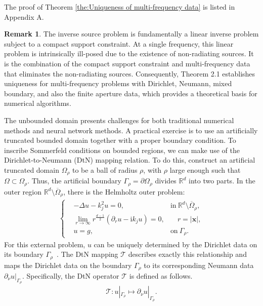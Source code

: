 \documentclass{article}
\theoremstyle{plain}
\theoremstyle{definition}
\newtheorem{remark}{\textbf{Remark}}
\begin{document}
The proof of Theorem \ref{the:Uniqueness of multi-frequency data} is listed in Appendix A.
\begin{remark}
\label{rem:uniqueness}
 {The inverse source problem is fundamentally a linear inverse problem subject to a compact support constraint. At a single frequency, this linear problem is intrinsically ill-posed due to the existence of non-radiating sources. It is the combination of the compact support constraint and multi-frequency data that eliminates the non-radiating sources. Consequently, Theorem 2.1 establishes uniqueness for multi-frequency problems with Dirichlet, Neumann, mixed boundary, and also the finite aperture data, which provides
a theoretical basis for numerical algorithms.}
\end{remark}

The unbounded domain presents challenges for both traditional numerical methods and neural network methods. A practical exercise is to use an artificially truncated bounded domain together with a proper boundary condition.
To inscribe Sommerfeld conditions on bounded regions, we can make use of the Dirichlet-to-Neumann (DtN) mapping relation. To do this, construct an artificial truncated domain $\Omega_{\rho}$ to be a ball of radius $\rho$, with $\rho$ large enough such that $\Omega \subset \Omega_{\rho}$. Thus, the artificial boundary $\Gamma_{\rho}=\partial \Omega_\rho$ divides $\mathbb{R}^d$ into two parts.
In the outer region $\mathbb{R}^d\setminus\overline{\Omega}_\rho$, there is the Helmholtz outer problem:
\begin{align}\label{out_helmholtz}
\left \{
\begin{aligned}
&-\Delta u-k_j^2u=0,  &\text{in} \  \mathbb{R}^d\setminus\overline{\Omega}_\rho, \\
&\lim_{r\to\infty}r^{\frac{d-1}{2}}\left({\partial_r u}-\mathrm{i}k_ju\right)=0, &\quad r=|\boldsymbol{x}|, \\
&u=g, &\text{on} \ \Gamma_{\rho}.
\end{aligned}
\right.
\end{align}
For this external problem, $u$ can be uniquely determined by the Dirichlet data on its boundary $\Gamma_{\rho}$~\cite{ShenWang2007AnalysisSpectralGalerkin}. 
The DtN mapping $\mathcal{T}$ describes exactly this relationship and maps the Dirichlet data on the boundary $\Gamma_{\rho}$ 
to its corresponding Neumann data $\partial _{\nu}u|_{\Gamma_{\rho}}$. Specifically, the DtN operator $\mathcal{T}$ is defined as follows.
\begin{align}
    \label{DtN}
\mathcal{T}:u|_{\Gamma_\rho}\mapsto\partial_\nu u|_{\Gamma_\rho}.
\end{align}
\end{document}
